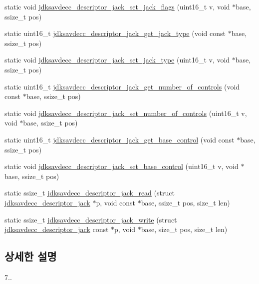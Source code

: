 \begin{DoxyCompactItemize}
\item 
static void \hyperlink{group__descriptor__jack_ga9a5a3726f7f2ae7d6487c9d237a2e55d}{jdksavdecc\+\_\+descriptor\+\_\+jack\+\_\+set\+\_\+jack\+\_\+flags} (uint16\+\_\+t v, void $\ast$base, ssize\+\_\+t pos)
\item 
static uint16\+\_\+t \hyperlink{group__descriptor__jack_ga1a9ce117eb7e8e95686e4101c253be0b}{jdksavdecc\+\_\+descriptor\+\_\+jack\+\_\+get\+\_\+jack\+\_\+type} (void const $\ast$base, ssize\+\_\+t pos)
\item 
static void \hyperlink{group__descriptor__jack_ga5edb1fc0eae78c6f028b5ddb95b9e19c}{jdksavdecc\+\_\+descriptor\+\_\+jack\+\_\+set\+\_\+jack\+\_\+type} (uint16\+\_\+t v, void $\ast$base, ssize\+\_\+t pos)
\item 
static uint16\+\_\+t \hyperlink{group__descriptor__jack_ga519ff673725c6cc9157798a24bf1876d}{jdksavdecc\+\_\+descriptor\+\_\+jack\+\_\+get\+\_\+number\+\_\+of\+\_\+controls} (void const $\ast$base, ssize\+\_\+t pos)
\item 
static void \hyperlink{group__descriptor__jack_ga03e53983195c6a9bb43e199536246730}{jdksavdecc\+\_\+descriptor\+\_\+jack\+\_\+set\+\_\+number\+\_\+of\+\_\+controls} (uint16\+\_\+t v, void $\ast$base, ssize\+\_\+t pos)
\item 
static uint16\+\_\+t \hyperlink{group__descriptor__jack_ga66e6cd48fd68493c3b3ac954c69dfec4}{jdksavdecc\+\_\+descriptor\+\_\+jack\+\_\+get\+\_\+base\+\_\+control} (void const $\ast$base, ssize\+\_\+t pos)
\item 
static void \hyperlink{group__descriptor__jack_gab3777f216d0c36766c891a9493988965}{jdksavdecc\+\_\+descriptor\+\_\+jack\+\_\+set\+\_\+base\+\_\+control} (uint16\+\_\+t v, void $\ast$base, ssize\+\_\+t pos)
\item 
static ssize\+\_\+t \hyperlink{group__descriptor__jack_gab0a20d734edaf0eaef33ee6c69fd8cf0}{jdksavdecc\+\_\+descriptor\+\_\+jack\+\_\+read} (struct \hyperlink{structjdksavdecc__descriptor__jack}{jdksavdecc\+\_\+descriptor\+\_\+jack} $\ast$p, void const $\ast$base, ssize\+\_\+t pos, size\+\_\+t len)
\item 
static ssize\+\_\+t \hyperlink{group__descriptor__jack_gaf5219748d05f3a584139d4388656b95e}{jdksavdecc\+\_\+descriptor\+\_\+jack\+\_\+write} (struct \hyperlink{structjdksavdecc__descriptor__jack}{jdksavdecc\+\_\+descriptor\+\_\+jack} const $\ast$p, void $\ast$base, size\+\_\+t pos, size\+\_\+t len)
\end{DoxyCompactItemize}


\subsection{상세한 설명}
7.. 

